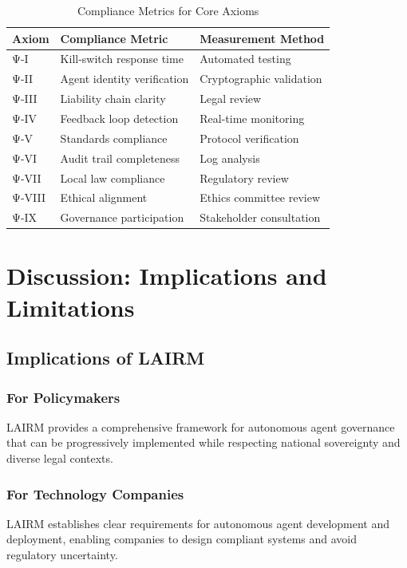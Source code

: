 \documentclass[12pt,a4paper,twoside,openright]{book}
\begin{document}
\begin{table}[h]
\centering
\begin{tabularx}{\textwidth}{@{}lXX@{}}
\toprule
\textbf{Axiom} & \textbf{Compliance Metric} & \textbf{Measurement Method} \\
\midrule
Ψ-I & Kill-switch response time & Automated testing \\
Ψ-II & Agent identity verification & Cryptographic validation \\
Ψ-III & Liability chain clarity & Legal review \\
Ψ-IV & Feedback loop detection & Real-time monitoring \\
Ψ-V & Standards compliance & Protocol verification \\
Ψ-VI & Audit trail completeness & Log analysis \\
Ψ-VII & Local law compliance & Regulatory review \\
Ψ-VIII & Ethical alignment & Ethics committee review \\
Ψ-IX & Governance participation & Stakeholder consultation \\
\bottomrule
\end{tabularx}
\caption{Compliance Metrics for Core Axioms}
\label{tab:compliance-metrics}
\end{table}

\chapter{Discussion: Implications and Limitations}
\label{ch:discussion}

\section{Implications of LAIRM}

\subsection{For Policymakers}

LAIRM provides a comprehensive framework for autonomous agent governance that can be progressively implemented while respecting national sovereignty and diverse legal contexts.

\subsection{For Technology Companies}

LAIRM establishes clear requirements for autonomous agent development and deployment, enabling companies to design compliant systems and avoid regulatory uncertainty.
\end{document}
